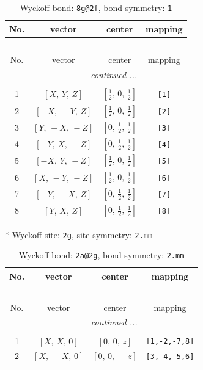 \documentclass[fleqn,8pt]{jsarticle}
\begin{document}
\begin{longtable}{cccc}
\caption{Wyckoff bond: {\tt 8g@2f}, bond symmetry: {\tt 1}}
 \\
 \hline \hline
No. & vector & center & mapping \\ \hline \endfirsthead

\multicolumn{3}{l}{\tablename\ \thetable{}} \\
 \hline \hline
No. & vector & center & mapping \\ \hline \endhead

 \hline \hline
\multicolumn{3}{r}{\footnotesize\it continued ...} \\ \endfoot

 \hline \hline
\multicolumn{3}{r}{} \\ \endlastfoot

1 & $\left[ X,\, Y,\, Z \right]$ & $\left[ \frac{1}{2},\, 0,\, \frac{1}{2} \right]$ & {\tt [1]} \\ \hline
2 & $\left[ - X,\, - Y,\, Z \right]$ & $\left[ \frac{1}{2},\, 0,\, \frac{1}{2} \right]$ & {\tt [2]} \\ \hline
3 & $\left[ Y,\, - X,\, - Z \right]$ & $\left[ 0,\, \frac{1}{2},\, \frac{1}{2} \right]$ & {\tt [3]} \\ \hline
4 & $\left[ - Y,\, X,\, - Z \right]$ & $\left[ 0,\, \frac{1}{2},\, \frac{1}{2} \right]$ & {\tt [4]} \\ \hline
5 & $\left[ - X,\, Y,\, - Z \right]$ & $\left[ \frac{1}{2},\, 0,\, \frac{1}{2} \right]$ & {\tt [5]} \\ \hline
6 & $\left[ X,\, - Y,\, - Z \right]$ & $\left[ \frac{1}{2},\, 0,\, \frac{1}{2} \right]$ & {\tt [6]} \\ \hline
7 & $\left[ - Y,\, - X,\, Z \right]$ & $\left[ 0,\, \frac{1}{2},\, \frac{1}{2} \right]$ & {\tt [7]} \\ \hline
8 & $\left[ Y,\, X,\, Z \right]$ & $\left[ 0,\, \frac{1}{2},\, \frac{1}{2} \right]$ & {\tt [8]} \\
\end{longtable}
* Wyckoff site: {\tt 2g}, site symmetry: {\tt 2.mm}
\renewcommand{\arraystretch}{1.2}
\begin{longtable}{cccc}
\caption{Wyckoff bond: {\tt 2a@2g}, bond symmetry: {\tt 2.mm}}
 \\
 \hline \hline
No. & vector & center & mapping \\ \hline \endfirsthead

\multicolumn{3}{l}{\tablename\ \thetable{}} \\
 \hline \hline
No. & vector & center & mapping \\ \hline \endhead

 \hline \hline
\multicolumn{3}{r}{\footnotesize\it continued ...} \\ \endfoot

 \hline \hline
\multicolumn{3}{r}{} \\ \endlastfoot

1 & $\left[ X,\, X,\, 0 \right]$ & $\left[ 0,\, 0,\, z \right]$ & {\tt [1,-2,-7,8]} \\ \hline
2 & $\left[ X,\, - X,\, 0 \right]$ & $\left[ 0,\, 0,\, - z \right]$ & {\tt [3,-4,-5,6]} \\
\end{longtable}
\end{document}
